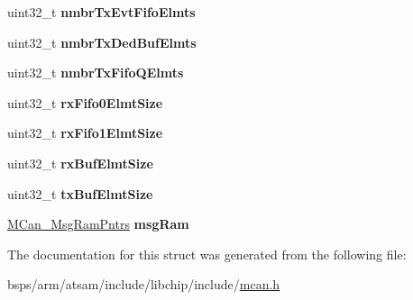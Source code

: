 \begin{DoxyCompactItemize}
uint32\+\_\+t {\bfseries nmbr\+Tx\+Evt\+Fifo\+Elmts}
\item 
\mbox{\label{structMCan__ConfigTag_a74bfd8a14212d5299bad0899bbafa6c8}} 
uint32\+\_\+t {\bfseries nmbr\+Tx\+Ded\+Buf\+Elmts}
\item 
\mbox{\label{structMCan__ConfigTag_a5af150d2d1a14712fd8103e2e4dd5070}} 
uint32\+\_\+t {\bfseries nmbr\+Tx\+Fifo\+Q\+Elmts}
\item 
\mbox{\label{structMCan__ConfigTag_af4c4f9f4550a6a5a5d5edde3fd87cc5e}} 
uint32\+\_\+t {\bfseries rx\+Fifo0\+Elmt\+Size}
\item 
\mbox{\label{structMCan__ConfigTag_a1d090584f012f589fae046bb0c488533}} 
uint32\+\_\+t {\bfseries rx\+Fifo1\+Elmt\+Size}
\item 
\mbox{\label{structMCan__ConfigTag_a97843e37cf46bd0da6743af0209db828}} 
uint32\+\_\+t {\bfseries rx\+Buf\+Elmt\+Size}
\item 
\mbox{\label{structMCan__ConfigTag_a716c34bd2911ef1f1fcd38ec59db49ac}} 
uint32\+\_\+t {\bfseries tx\+Buf\+Elmt\+Size}
\item 
\mbox{\label{structMCan__ConfigTag_af40df85b81a6296b5862b58a7c6133aa}} 
\mbox{\hyperlink{structMCan__MsgRamPntrsTag}{M\+Can\+\_\+\+Msg\+Ram\+Pntrs}} {\bfseries msg\+Ram}
\end{DoxyCompactItemize}


The documentation for this struct was generated from the following file\+:\begin{DoxyCompactItemize}
\item 
bsps/arm/atsam/include/libchip/include/\mbox{\hyperlink{mcan_8h}{mcan.\+h}}\end{DoxyCompactItemize}
